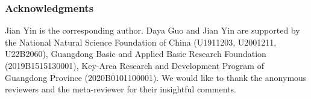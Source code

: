 \documentclass{article}
\begin{document}
\subsubsection*{Acknowledgments}
Jian Yin is the corresponding author. Daya Guo and Jian Yin are supported by the National Natural Science Foundation of China (U1911203, U2001211, U22B2060), Guangdong Basic and Applied Basic Research Foundation (2019B1515130001), Key-Area Research and Development Program of Guangdong Province (2020B0101100001). We would like to thank the anonymous reviewers and the meta-reviewer for their insightful comments.
































































\end{document}
